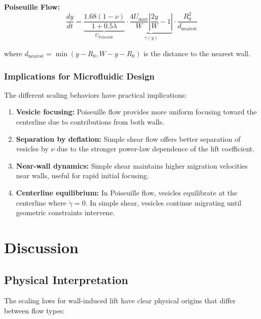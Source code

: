 \documentclass{article}
\begin{document}
\textbf{Poiseuille Flow:}
\begin{equation}
    \frac{dy}{dt} = \underbrace{\frac{1.68(1-\nu)}{1 + 0.5\lambda}}_{U_{\text{Poiseuille}}} \cdot \underbrace{\frac{4U_{\max}}{W}\left|\frac{2y}{W}-1\right|}_{\dot{\gamma}(y)} \cdot \frac{R_0^2}{d_{\text{nearest}}}
    \label{eq:poiseuille_complete}
\end{equation}

where $d_{\text{nearest}} = \min(y - R_0, W - y - R_0)$ is the distance to the nearest wall.

\subsubsection{Implications for Microfluidic Design}

The different scaling behaviors have practical implications:

\begin{enumerate}
    \item \textbf{Vesicle focusing:} Poiseuille flow provides more uniform focusing toward the centerline due to contributions from both walls.
    
    \item \textbf{Separation by deflation:} Simple shear flow offers better separation of vesicles by $\nu$ due to the stronger power-law dependence of the lift coefficient.
    
    \item \textbf{Near-wall dynamics:} Simple shear maintains higher migration velocities near walls, useful for rapid initial focusing.
    
    \item \textbf{Centerline equilibrium:} In Poiseuille flow, vesicles equilibrate at the centerline where $\dot{\gamma} = 0$. In simple shear, vesicles continue migrating until geometric constraints intervene.
\end{enumerate}

\section{Discussion}

\subsection{Physical Interpretation}

The scaling laws for wall-induced lift have clear physical origins that differ between flow types:
\end{document}
